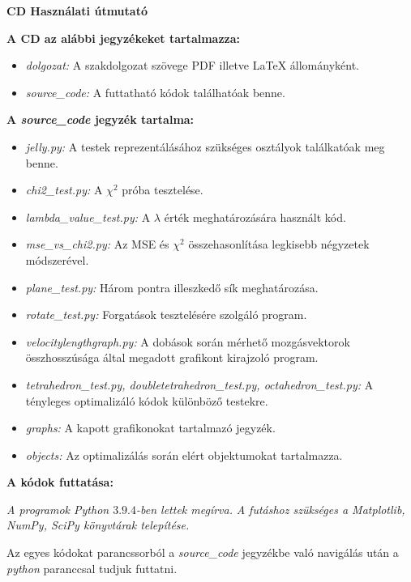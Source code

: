 \pagestyle{empty}

\noindent \textbf{\Large CD Használati útmutató}

\vskip 1cm

\noindent \textbf{A CD az alábbi jegyzékeket tartalmazza:}
\begin{itemize}
	\item\textit{dolgozat:} A szakdolgozat szövege PDF illetve LaTeX állományként.
	\item\textit{source{\_}code:} A futtatható kódok találhatóak benne.
\end{itemize}

\noindent\textbf{A \textit{source{\_}code} jegyzék tartalma:}
\begin{itemize}
	\item\textit{jelly.py:} A testek reprezentálásához szükséges osztályok találkatóak meg benne.
	\item\textit{chi2{\_}test.py:} A $\chi^2$ próba tesztelése.
	\item\textit{lambda{\_}value{\_}test.py:} A $\lambda$ érték meghatározására használt kód.
	\item\textit{mse{\_}vs{\_}chi2.py:} Az MSE és $\chi^2$ összehasonlítása legkisebb négyzetek módszerével.
	\item\textit{plane{\_}test.py:} Három pontra illeszkedő sík meghatározása.
	\item\textit{rotate{\_}test.py:} Forgatások tesztelésére szolgáló program.
	\item\textit{velocitylengthgraph.py:} A dobások során mérhető mozgásvektorok összhosszúsága által megadott grafikont kirajzoló program.
	\item\textit{tetrahedron{\_}test.py, doubletetrahedron{\_}test.py, octahedron{\_}test.py:} A tényleges optimalizáló kódok különböző testekre.
	\item\textit{graphs:} A kapott grafikonokat tartalmazó jegyzék.
	\item\textit{objects:} Az optimalizálás során elért objektumokat tartalmazza.
\end{itemize}

\noindent\textbf{A kódok futtatása:}

\textit{A programok Python $3.9.4$-ben lettek megírva.}
\textit{A futáshoz szükséges a Matplotlib, NumPy, SciPy könyvtárak telepítése.}

Az egyes kódokat parancssorból a \textit{source{\_}code} jegyzékbe való navigálás után a \textit{python} paranccsal tudjuk futtatni.
